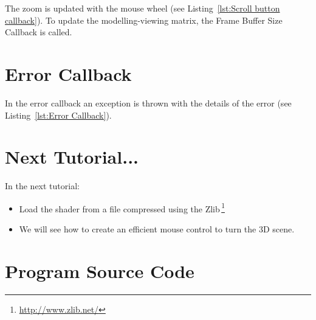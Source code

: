\documentclass[11pt,oneside,a4paper,final]{article}
\begin{document}
The zoom is updated with the mouse wheel 
(see Listing~\ref{lst:Scroll button callback}). 
To update the modelling-viewing matrix, the Frame Buffer Size Callback is 
called.

\begin{center}

\end{center}


\section{Error Callback}
\label{sec:Error Callback}

In the error callback an exception is thrown with the details of the error 
(see Listing~\ref{lst:Error Callback}).

\begin{center}

\end{center}


\section{Next Tutorial...}
\label{sec:Next Tutorial}

In the next tutorial:
\begin{itemize}
	\item Load the shader from a file compressed using 
		the Zlib\,\footnote{\url{http://www.zlib.net/}}
%  
% 
	\item We will see how to create an efficient mouse control to turn the 
		3D scene. 
% 
\end{itemize}



\appendix
\section{Program Source Code}
\label{sec:Program Source Code}

\begin{center}
  
\end{center}

% 
% 
\end{document}
